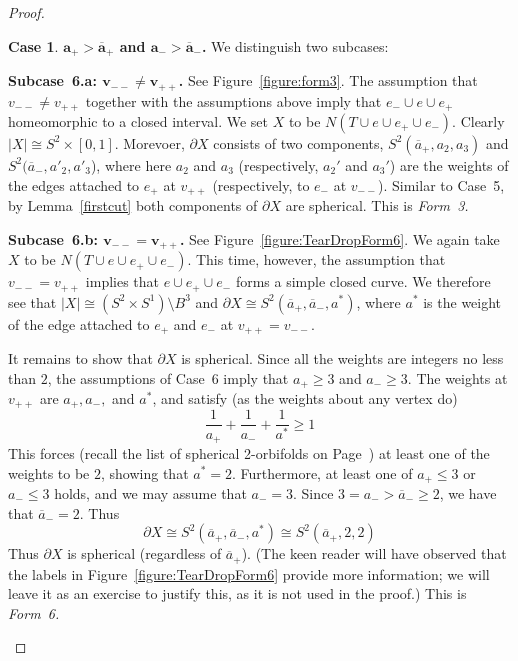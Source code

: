 \documentclass[12pt,reqno]{amsart}
\theoremstyle{plain}
\theoremstyle{definition}
\newtheorem{case}{Case}
\numberwithin{subcase}{case}
\theoremstyle{plain}
\theoremstyle{definition}
\def\ep{e_{+}}
\def\eem{e_{-}}
\def\vpp{v_{++}}
\def\vmm{v_{--}}
\def\oap{\overline{a}_{+}}
\def\oam{\overline{a}_{-}}
\def\ap{a_{+}}
\def\am{a_{-}}
\begin{document}
\begin{proof}
\noindent\begin{case}
\textbf{\(\boldsymbol{\ap > \oap}\) and \(\boldsymbol{\am > \oam}\).} We distinguish two subcases:


\bigskip\noindent
{\bf Subcase~6.a: \(\boldsymbol{\vmm \neq \vpp}\).} See Figure~\ref{figure:form3}.  The assumption that \(\vmm \neq \vpp\) together with the assumptions above imply that \(e_{-} \cup e \cup e_{+}\) homeomorphic to a closed interval. We set \(X\) to be \(N(T \cup e \cup e_{+} \cup e_{-})\). Clearly \(|X| \cong S^{2} \times [0,1]\).  Morevoer, \(\partial X\) consists of two components,  \(S^{2}(\oap,a_{2},a_{3})\) and  \(S^{2}(\oam,a'_{2},a'_{3}\)), where here \(a_{2}\) and \(a_{3}\) (respectively, \(a_{2}'\) and \(a_{3}'\)) are the weights of the edges attached to \(\ep\) at \(\vpp\) (respectively, to \(\eem\) at \(\vmm\)).  
Similar to Case~5, by Lemma~\ref{firstcut} both components of \(\partial X\) are spherical.  This is \em Form~3.\em

\bigskip\noindent
{\bf Subcase~6.b: \(\boldsymbol{\vmm = \vpp}\).} See Figure~\ref{figure:TearDropForm6}. We again take \(X\) to be \(N(T \cup e \cup e_{+} \cup e_{-})\). This time, however, the assumption that \(\vmm = \vpp\) implies that \( e \cup e_{+} \cup e_{-}\) forms a simple closed curve. We therefore see that \(|X| \cong (S^{2} \times S^{1}) \setminus B^{3}\) and \(\partial X \cong S^{2}(\oap,\oam,a^{*})\), where  \(a^{*}\) is the weight of the edge attached to \(\ep\) and \(\eem\) at \(\vpp=\vmm\).

It remains to show that \(\partial X\) is spherical.  
Since all the weights are integers no less than \(2\), 
the assumptions of Case~6 imply that \(\ap \geq 3\) and \(\am \geq 3\).  
The weights at \(\vpp\) are \(\ap, \am,\) and \(a^{*}\), and satisfy (as the weights about any vertex do) 
\[
\frac{1}{\ap} + \frac{1}{\am} + \frac{1}{a^{*}} \geq 1
\]
This forces (recall the list of spherical 2-orbifolds on Page~\pageref{2orbifolds}) at least one of the weights to be \(2\), showing that \(a^{*} = 2\).  
Furthermore, at least one of \(\ap \leq 3\) or \(\am \leq 3\) holds, and we may assume that \(\am = 3\). 
Since \(3=\am > \oam \geq 2\), we have that \(\oam = 2\).   Thus 
\[
\partial X \cong S^{2}(\oap,\oam,a^{*}) \cong S^{2}(\oap,2,2)
\]
Thus \(\partial X\) is spherical (regardless of \(\oap\)).  (The keen reader will have observed that the labels in Figure~\ref{figure:TearDropForm6} provide more information; we will leave it as an exercise to justify this, as it is not used in the proof.) This is \em Form~6.\em
\end{case}
\end{proof}
\end{document}
